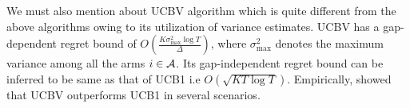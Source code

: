	We must also mention about UCBV \citep{audibert2009exploration} algorithm which is quite different  from the above algorithms owing to its utilization of variance estimates. UCBV has a gap-dependent regret bound of $O\left(\frac{K\sigma_{\max}^{2}\log T}{\Delta}\right)$, where $\sigma_{\max}^{2}$ denotes the maximum variance among all the arms $i\in \mathcal{A}$. Its gap-independent regret bound can be inferred to be same as that of UCB1 i.e $O \left(\sqrt{KT\log T}\right)$. Empirically, \citet{audibert2009exploration} showed that UCBV outperforms UCB1 in several scenarios. 